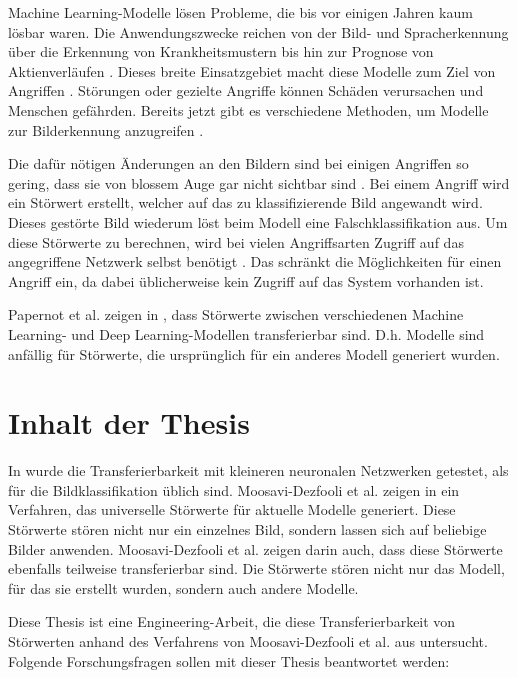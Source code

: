 \documentclass{FFHS_Thesis_Additions/ffhsthesis}
\begin{document}
Machine Learning-Modelle lösen Probleme, die bis vor einigen Jahren kaum lösbar waren. 
Die Anwendungszwecke reichen von der Bild- und Spracherkennung über die Erkennung von Krankheitsmustern bis hin zur Prognose von Aktienverläufen \cite{dargan_survey_2019}. 
Dieses breite Einsatzgebiet macht diese Modelle zum Ziel von Angriffen \cite{isakov_survey_2019}. 
Störungen oder gezielte Angriffe können Schäden verursachen und Menschen gefährden. 
Bereits jetzt gibt es verschiedene Methoden, um Modelle zur Bilderkennung anzugreifen \cite{akhtar_threat_2018}. 

Die dafür nötigen Änderungen an den Bildern sind bei einigen Angriffen so gering, dass sie von blossem Auge gar nicht sichtbar sind \cite{su_one_2019}. 
Bei einem Angriff wird ein Störwert erstellt, welcher auf das zu klassifizierende Bild angewandt wird.
Dieses gestörte Bild wiederum löst beim Modell eine Falschklassifikation aus.
Um diese Störwerte zu berechnen, wird bei vielen Angriffsarten Zugriff auf das angegriffene Netzwerk selbst benötigt \cite{akhtar_threat_2018}. 
Das schränkt die Möglichkeiten für einen Angriff ein, da dabei üblicherweise kein Zugriff auf das System vorhanden ist.

Papernot et al. zeigen in \cite{papernot_transferability_2016}, dass Störwerte zwischen verschiedenen Machine Learning- und Deep Learning-Modellen transferierbar sind. 
D.h. Modelle sind anfällig für Störwerte, die ursprünglich für ein anderes Modell generiert wurden.


\section{Inhalt der Thesis}

 In \cite{papernot_transferability_2016} wurde die Transferierbarkeit mit kleineren neuronalen Netzwerken getestet, als für die Bildklassifikation üblich sind. 
 Moosavi-Dezfooli et al. zeigen in \cite{moosavi-dezfooli_universal_2017-1} ein Verfahren, das universelle Störwerte für aktuelle Modelle generiert. 
 Diese Störwerte stören nicht nur ein einzelnes Bild, sondern lassen sich auf beliebige Bilder anwenden. 
 Moosavi-Dezfooli et al. zeigen darin auch, dass diese Störwerte ebenfalls teilweise transferierbar sind. 
 Die Störwerte stören nicht nur das Modell, für das sie erstellt wurden, sondern auch andere Modelle.

Diese Thesis ist eine Engineering-Arbeit, die diese Transferierbarkeit von Störwerten anhand des Verfahrens von Moosavi-Dezfooli et al. aus \cite{moosavi-dezfooli_universal_2017-1} untersucht. 
Folgende Forschungsfragen sollen mit dieser Thesis beantwortet werden:
\end{document}
